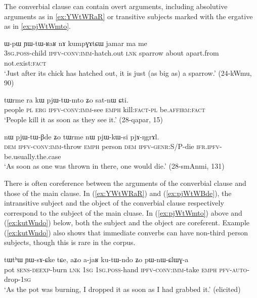 The converbial clause can contain overt arguments, including  absolutive arguments as in \ref{ex:YWtWRaR} or transitive subjects marked with the ergative as in \ref{ex:pjWtWmto}. 

\begin{exe}
\ex \label{ex:YWtWRaR} 
\gll  ɯ-pɯ ɲɯ-tɯ-ʁaʁ nɤ kumpɣɤtɕɯ jamar ma me	\\
\textsc{3sg.poss}-child \textsc{ipfv-conv:imm}-hatch.out \textsc{lnk} sparrow about apart.from not.exist:\textsc{fact} \\
\glt `Just after its chick has hatched out, it is just (as big as) a sparrow.' (24-kWmu, 90)
\end{exe}

\begin{exe}
\ex \label{ex:pjWtWmto}
\gll tɯrme ra kɯ pjɯ-tɯ-mto ʑo sat-nɯ ɕti.    \\
people \textsc{pl} \textsc{erg} \textsc{ipfv-conv:imm}-see \textsc{emph} kill:\textsc{fact}-\textsc{pl} be.\textsc{affirm}:\textsc{fact} \\
\glt  `People kill it as soon as they see it.' (28-qapar, 15)
\end{exe}


\begin{exe}
\ex \label{ex:pjWtWBde} 
\gll nɯ pjɯ-tɯ-βde ʑo tɯrme nɯ pjɯ-kɯ-si pjɤ-ŋgrɤl. \\
\textsc{dem} \textsc{ipfv-conv:imm}-throw \textsc{emph} person \textsc{dem} \textsc{ipfv}-\textsc{genr}:S/P-die \textsc{ifr}.\textsc{ipfv}-be.usually.the.case \\
\glt `As soon as one was thrown in there, one would die.' (28-smAnmi, 131)
\end{exe}

There is often coreference between the arguments of the converbial clause and those of the main clause. In (\ref{ex:YWtWRaR}) and (\ref{ex:pjWtWBde}), the intransitive subject and the object of the converbial clause respectively correspond to the subject of the main cluase. In (\ref{ex:pjWtWmto}) above and (\ref{ex:kutWndo}) below, both the subject and the object are coreferent. Example (\ref{ex:kutWndo}) also shows that immediate converbs can have non-third person subjects, though this is rare in the corpus.

\begin{exe}
\ex \label{ex:kutWndo} 
\gll tɯtʰɯ ɲɯ-sɤ-ɕke tɕe, aʑo a-jaʁ ku-tɯ-ndo ʑo pɯ-nɯ-ɕlɯɣ-a \\
pot \textsc{sens}-\textsc{deexp}-burn \textsc{lnk} \textsc{1sg} \textsc{1sg}.\textsc{poss}-hand \textsc{ipfv}-\textsc{conv}:\textsc{imm}-take \textsc{emph} \textsc{pfv}-\textsc{auto}-drop-\textsc{1sg} \\
\glt `As the pot was burning, I dropped it as soon as I had grabbed it.' (elicited)
\end{exe}

